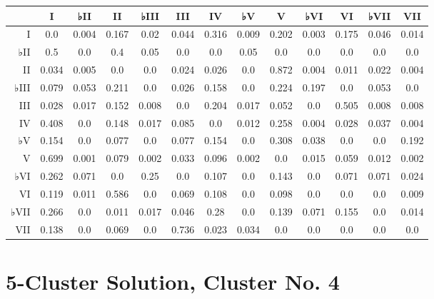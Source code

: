 \begin{table}[htbp]
\begin{minipage}{\linewidth}
\setlength{\tymax}{0.5\linewidth}
\centering
\small
\begin{tabulary}{\textwidth}{@{}RCCCCCCCCCCCC@{}} \toprule
&I&♭II&II&♭III&III&IV&♭V&V&♭VI&VI&♭VII&VII\\
\midrule
I&0.0&0.004&0.167&0.02&0.044&0.316&0.009&0.202&0.003&0.175&0.046&0.014\\
♭II&0.5&0.0&0.4&0.05&0.0&0.0&0.05&0.0&0.0&0.0&0.0&0.0\\
II&0.034&0.005&0.0&0.0&0.024&0.026&0.0&0.872&0.004&0.011&0.022&0.004\\
♭III&0.079&0.053&0.211&0.0&0.026&0.158&0.0&0.224&0.197&0.0&0.053&0.0\\
III&0.028&0.017&0.152&0.008&0.0&0.204&0.017&0.052&0.0&0.505&0.008&0.008\\
IV&0.408&0.0&0.148&0.017&0.085&0.0&0.012&0.258&0.004&0.028&0.037&0.004\\
♭V&0.154&0.0&0.077&0.0&0.077&0.154&0.0&0.308&0.038&0.0&0.0&0.192\\
V&0.699&0.001&0.079&0.002&0.033&0.096&0.002&0.0&0.015&0.059&0.012&0.002\\
♭VI&0.262&0.071&0.0&0.25&0.0&0.107&0.0&0.143&0.0&0.071&0.071&0.024\\
VI&0.119&0.011&0.586&0.0&0.069&0.108&0.0&0.098&0.0&0.0&0.0&0.009\\
♭VII&0.266&0.0&0.011&0.017&0.046&0.28&0.0&0.139&0.071&0.155&0.0&0.014\\
VII&0.138&0.0&0.069&0.0&0.736&0.023&0.034&0.0&0.0&0.0&0.0&0.0\\

\bottomrule

\end{tabulary}
\end{minipage}
\end{table}

\section{5-Cluster Solution, Cluster No. 4}
\label{5-clustersolutionclusterno.4}

